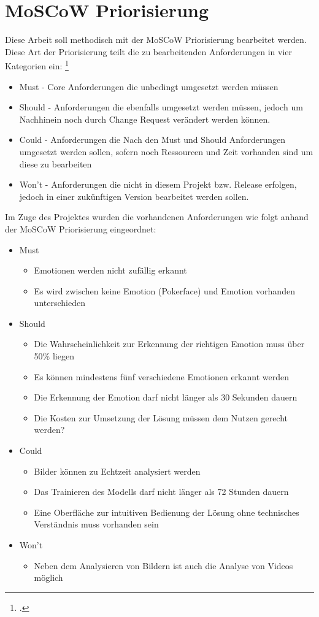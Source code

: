 \documentclass[12pt, a4paper]{scrbook}
\begin{document}
\section{MoSCoW Priorisierung}
Diese Arbeit soll methodisch mit der MoSCoW Priorisierung bearbeitet werden. Diese Art der Priorisierung teilt die zu bearbeitenden Anforderungen in vier Kategorien ein:
\footcite[vgl.][90]{Projektmanagement}
\begin{itemize}
\item Must - Core Anforderungen die unbedingt umgesetzt werden müssen
\item Should - Anforderungen die ebenfalls umgesetzt werden müssen, jedoch um Nachhinein noch durch Change Request verändert werden können.
\item Could - Anforderungen die Nach den Must und Should Anforderungen umgesetzt werden sollen, sofern noch Ressourcen und Zeit vorhanden sind um diese zu bearbeiten
\item Won't - Anforderungen die nicht in diesem Projekt bzw. Release erfolgen, jedoch in einer zukünftigen Version bearbeitet werden sollen. 
\end{itemize}
Im Zuge des Projektes wurden die vorhandenen Anforderungen wie folgt anhand der MoSCoW Priorisierung eingeordnet:
\begin{itemize}
\item Must
\begin{itemize}
\item Emotionen werden nicht zufällig erkannt
\item Es wird zwischen keine Emotion (Pokerface) und Emotion vorhanden unterschieden
\end{itemize}
\item Should
\begin{itemize}
\item Die Wahrscheinlichkeit zur Erkennung der richtigen Emotion muss über 50\% liegen
\item Es können mindestens fünf verschiedene Emotionen erkannt werden
\item Die Erkennung der Emotion darf nicht länger als 30 Sekunden dauern
\item Die Kosten zur Umsetzung der Lösung müssen dem Nutzen gerecht werden?
\end{itemize}
\item Could
\begin{itemize}
\item Bilder können zu Echtzeit analysiert werden
\item Das Trainieren des Modells darf nicht länger als 72 Stunden dauern
\item Eine Oberfläche zur intuitiven Bedienung der Lösung ohne technisches Verständnis muss vorhanden sein
\end{itemize}
\item Won't
\begin{itemize}
\item Neben dem Analysieren von Bildern ist auch die Analyse von Videos möglich
\end{itemize}
\end{itemize}
\end{document}
